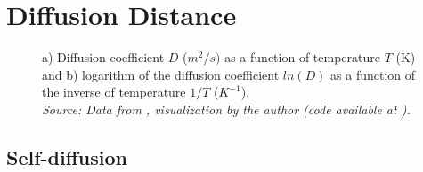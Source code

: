 \newpage
\section{Diffusion Distance}

\begin{figure}[h]
 \centering
 \captionsetup{justification=centering,margin=2cm}
 \caption{a) Diffusion coefficient $D$ ($m^2/s)$ as a function of temperature $T$ (K) and b) logarithm of the diffusion coefficient $ln(D)$ as a function of the inverse of temperature $1/T$ ($K^{-1}$). \\
 \textit{Source: Data from \citep{kakusan}, visualization by the author (code available at \citep{mygit}).}}
 \label{fig:diffusion}
\end{figure}


\subsection{Self-diffusion}


